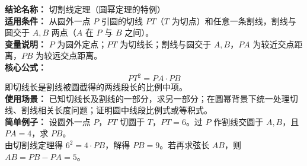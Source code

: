 \textbf{结论名称：} 切割线定理（圆幂定理的特例）\\
\textbf{适用条件：} 从圆外一点 \(P\) 引圆的切线 \(PT\)（\(T\) 为切点）和任意一条割线，割线与圆交于 \(A,B\) 两点（\(A\) 在 \(P\) 与 \(B\) 之间）。\\
\textbf{变量说明：} \(P\) 为圆外定点；\(PT\) 为切线长；割线与圆交于 \(A,B\)，\(PA\) 为较近交点距离，\(PB\) 为较远交点距离。\\
\textbf{核心公式：} \[ \boxed{PT^{2} = PA \cdot PB} \] 即切线长是割线被圆截得的两线段长的比例中项。\\
\textbf{使用场景：} 已知切线长及割线的一部分，求另一部分；在圆幂背景下统一处理切线、割线相关长度问题；证明圆中线段比例式或等积式。\\
\textbf{简单例子：} 设圆外一点 \(P\)，\(PT\) 切圆于 \(T\)，\(PT=6\)。过 \(P\) 作割线交圆于 \(A,B\)，且 \(PA=4\)，求 \(PB\)。\\
由切割线定理得 \(6^2 = 4 \cdot PB\)，解得 \(PB = 9\)。若再求弦长 \(AB\)，则 \(AB = PB - PA = 5\)。